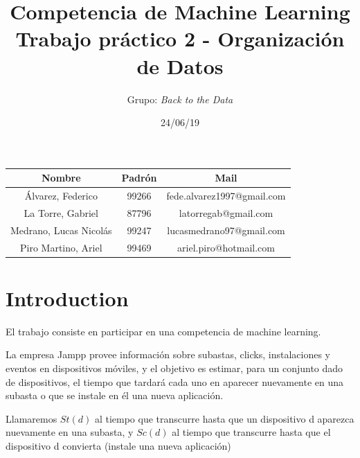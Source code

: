 \documentclass{article}
\title{Competencia de Machine Learning \\ Trabajo práctico 2 - Organización de Datos}
\author{Grupo: \textit{Back to the Data}}
\date{24/06/19}
\begin{document}
\begin{figure}
    \centering
\end{figure}
\maketitle

\FloatBarrier
\begin{center}
        \begin{tabular}{ |c|c|c| }
          \hline
          Nombre & Padrón & Mail \\
          \hline\hline
          Álvarez, Federico & 99266 & fede.alvarez1997@gmail.com \\
          \hline
          La Torre, Gabriel & 87796 & latorregab@gmail.com \\
          \hline
          Medrano, Lucas Nicolás & 99247 & lucasmedrano97@gmail.com \\
          \hline
          Piro Martino, Ariel & 99469 & ariel.piro@hotmail.com \\
          \hline
        \end{tabular}
\end{center}
\FloatBarrier

\newpage

\tableofcontents
\newpage

\section{Introduction}
El trabajo consiste en participar en una competencia de machine learning. 

La empresa Jampp provee información sobre subastas, clicks, instalaciones y eventos en dispositivos móviles, y el objetivo es estimar, para un conjunto dado de dispositivos, el tiempo que tardará cada uno en aparecer nuevamente en una
subasta o que se instale en él una nueva aplicación.

Llamaremos $St(d)$ al tiempo que transcurre hasta que un dispositivo d aparezca nuevamente en una subasta, y $Sc(d)$ al tiempo que transcurre hasta que el dispositivo d convierta (instale una nueva aplicación)
\end{document}
